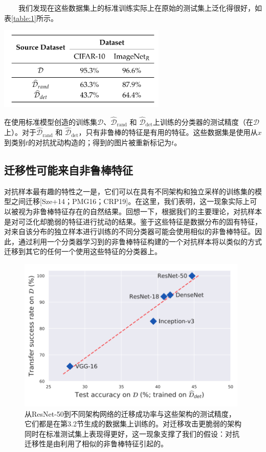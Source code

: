 \documentclass{article}
\begin{document}
\ \ \ \ 我们发现在这些数据集上的标准训练实际上在原始的测试集上泛化得很好，如表\ref{table:1}所示。
\begin{table}
  \centering
  \includegraphics[width=8cm]{fig/table1.png}
  \caption{在使用标准模型创造的训练集$\mathcal{D}$、$ \widehat{\mathcal{D}}_{\text {rand}}$ 和 $\widehat{\mathcal{D}}_{\text {det}}$上训练的分类器的测试精度（在$\mathcal{D}$上）。对于$ \widehat{\mathcal{D}}_{\text {rand}}$ 和 $\widehat{\mathcal{D}}_{\text {det}}$，只有非鲁棒的特征是有用的特征。这些数据集是使用从$x$到类别$t$的对抗扰动构造的；得到的图片被重新标记为$t$。}
  \label{table:1}
\end{table}

\subsection{迁移性可能来自非鲁棒特征}

对抗样本最有趣的特性之一是，它们可以在具有不同架构和独立采样的训练集的模型之间迁移[Sze+14；PMG16；CRP19]。在这里，我们表明，这一现象实际上可以被视为非鲁棒特征存在的自然结果。回想一下，根据我们的主要理论，对抗样本是对可泛化却脆弱的特征进行扰动的结果。鉴于这些特征是数据分布的固有特征，对来自该分布的独立样本进行训练的不同分类器可能会使用相似的非鲁棒特征。因此，通过利用一个分类器学习到的非鲁棒特征构建的一个对抗样本将以类似的方式迁移到其它的任何一个使用这些特征的分类器上。

\begin{figure}
  \centering
  \includegraphics[width=11cm]{fig/figure3.png}
  \caption{从ResNet-50到不同架构网络的迁移成功率与这些架构的测试精度，它们都是在第3.2节生成的数据集上训练的。对迁移攻击更脆弱的架构同时在标准测试集上表现得更好，这一现象支撑了我们的假设：对抗迁移性是由利用了相似的非鲁棒特征引起的。}
  \label{figure:3}
\end{figure}
\end{document}
